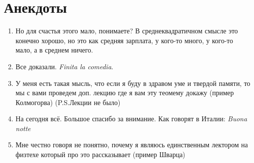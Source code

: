 \newpage
\section{Анекдоты}
\begin{enumerate}
	\item Но для счастья этого мало, понимаете? В среднеквадратичном смысле это конечно хорошо, но это как средняя зарплата, у кого-то много, у кого-то мало, а в среднем ничего.

	\item Все доказали. \textit{Finita la comedia}.

	\item У меня есть такая мысль, что если я буду в здравом уме и твердой памяти, то мы с вами проведем доп. лекцию где я вам эту теомему докажу (пример Колмогорва) (P.S.Лекции не было)

	\item На сегодня всё. Большое спасибо за внимание. Как говорят в Италии: \textit{Buona notte}

	\item Мне честно говоря не понятно, почему я являюсь единственным лектором на физтехе который про это рассказывает (пример Шварца)
\end{enumerate}